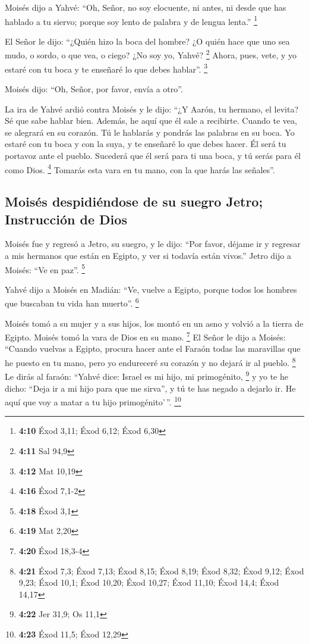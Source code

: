 \begin{paracol}{2}
 Moisés dijo a Yahvé: ``Oh, Señor, no soy elocuente, ni
antes, ni desde que has hablado a tu siervo; porque soy lento de palabra
y de lengua lenta.'' \footnote{\textbf{4:10} Éxod 3,11; Éxod 6,12; Éxod
  6,30}

 El Señor le dijo: ``¿Quién hizo la boca del hombre? ¿O
quién hace que uno sea mudo, o sordo, o que vea, o ciego? ¿No soy yo,
Yahvé? \footnote{\textbf{4:11} Sal 94,9}  Ahora, pues,
vete, y yo estaré con tu boca y te enseñaré lo que debes hablar''.
\footnote{\textbf{4:12} Mat 10,19}

 Moisés dijo: ``Oh, Señor, por favor, envía a otro''.

 La ira de Yahvé ardió contra Moisés y le dijo: ``¿Y
Aarón, tu hermano, el levita? Sé que sabe hablar bien. Además, he aquí
que él sale a recibirte. Cuando te vea, se alegrará en su corazón.
 Tú le hablarás y pondrás las palabras en su boca. Yo
estaré con tu boca y con la suya, y te enseñaré lo que debes hacer.
 Él será tu portavoz ante el pueblo. Sucederá que él será
para ti una boca, y tú serás para él como Dios. \footnote{\textbf{4:16}
  Éxod 7,1-2}  Tomarás esta vara en tu mano, con la que
harás las señales''.

\hypertarget{moisuxe9s-despidiuxe9ndose-de-su-suegro-jetro-instrucciuxf3n-de-dios}{%
\subsection{Moisés despidiéndose de su suegro Jetro; Instrucción de
Dios}\label{moisuxe9s-despidiuxe9ndose-de-su-suegro-jetro-instrucciuxf3n-de-dios}}

 Moisés fue y regresó a Jetro, su suegro, y le dijo:
``Por favor, déjame ir y regresar a mis hermanos que están en Egipto, y
ver si todavía están vivos.'' Jetro dijo a Moisés: ``Ve en paz''.
\footnote{\textbf{4:18} Éxod 3,1}

 Yahvé dijo a Moisés en Madián: ``Ve, vuelve a Egipto,
porque todos los hombres que buscaban tu vida han muerto''. \footnote{\textbf{4:19}
  Mat 2,20}

 Moisés tomó a su mujer y a sus hijos, los montó en un
asno y volvió a la tierra de Egipto. Moisés tomó la vara de Dios en su
mano. \footnote{\textbf{4:20} Éxod 18,3-4}  El Señor le
dijo a Moisés: ``Cuando vuelvas a Egipto, procura hacer ante el Faraón
todas las maravillas que he puesto en tu mano, pero yo endureceré su
corazón y no dejará ir al pueblo. \footnote{\textbf{4:21} Éxod 7,3; Éxod
  7,13; Éxod 8,15; Éxod 8,19; Éxod 8,32; Éxod 9,12; Éxod 9,23; Éxod
  10,1; Éxod 10,20; Éxod 10,27; Éxod 11,10; Éxod 14,4; Éxod 14,17}
 Le dirás al faraón: ``Yahvé dice: Israel es mi hijo, mi
primogénito, \footnote{\textbf{4:22} Jer 31,9; Os 11,1} 
y yo te he dicho: ``Deja ir a mi hijo para que me sirva'', y tú te has
negado a dejarlo ir. He aquí que voy a matar a tu hijo primogénito'\,''.
\footnote{\textbf{4:23} Éxod 11,5; Éxod 12,29}


\end{paracol}
